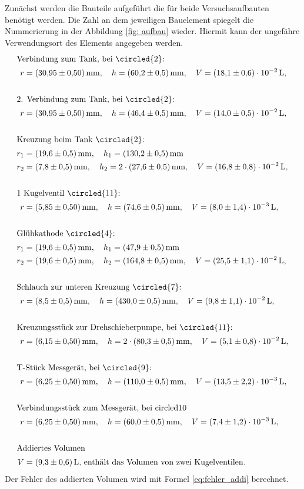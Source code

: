 Zunächst werden die Bauteile aufgeführt die für beide Versuchsaufbauten benötigt werden.
Die Zahl an dem jeweiligen Bauelement spiegelt die Nummerierung in der Abbildung \ref{fig: aufbau} wieder.
Hiermit kann der ungefähre Verwendungsort des Elements angegeben werden.
\begin{align*}
  \shortintertext{Verbindung zum Tank, bei \circled{2}:}
  r&=\SI{30.95\pm 0.5}{\milli\meter}, \quad h=\SI{60.2\pm0.5}{\milli\meter}, \quad V=\SI{ 18.1\pm0.6 e-2}{\litre},\\
  \\
  \shortintertext{2. Verbindung zum Tank, bei  \circled{2}:}
  r&=\SI{30.95\pm 0.5}{\milli\meter}, \quad h=\SI{46.4\pm0.5}{\milli\meter}, \quad V=\SI{ 14.0\pm0.5 e-2}{\litre},\\
  \\
  \shortintertext{Kreuzung beim Tank \circled{2}:}
  r_1&=\SI{19.6\pm 0.5}{\milli\meter}, \quad h_1=\SI{130.2\pm0.5}{\milli\meter}\\
  r_2&=\SI{7.8\pm 0.5}{\milli\meter}, \quad h_2=2\cdot  \SI{27.6\pm0.5}{\milli\meter}, \quad V=\SI{ 16.8\pm0.8 e-2}{\litre},\\
  \\
  \shortintertext{1 Kugelventil \circled{11}:}
  r&=\SI{5.85\pm 0.5}{\milli\meter}, \quad h=\SI{74.6\pm0.5}{\milli\meter}, \quad V=\SI{ 8.0\pm1.4 e-3}{\litre},\\
  \\
  \shortintertext{Glühkathode \circled{4}:}
  r_1&=\SI{19.6\pm 0.5}{\milli\meter}, \quad h_1=\SI{47.9\pm0.5}{\milli\meter}\\
  r_2&=\SI{19.6\pm 0.5}{\milli\meter}, \quad h_2=\SI{164.8\pm0.5}{\milli\meter}, \quad V=\SI{ 25.5\pm1.1 e-2}{\litre},\\
  \\
  \shortintertext{Schlauch zur unteren Kreuzung \circled{7}: }
  r&=\SI{8.5\pm 0.5}{\milli\meter}, \quad h=\SI{430\pm0.5}{\milli\meter}, \quad V=\SI{ 9.8\pm1.1 e-2}{\litre},\\
  \\
  \shortintertext{Kreuzungsstück zur Drehschieberpumpe, bei \circled{11}:}
  r&=\SI{6.15\pm 0.5}{\milli\meter}, \quad h=2\cdot\SI{80.3\pm0.5}{\milli\meter}, \quad V=\SI{ 5.1\pm0.8 e-2}{\litre},\\
  \\
  \shortintertext{T-Stück Messgerät, bei \circled{9}: }
  r&=\SI{6.25\pm 0.5}{\milli\meter}, \quad h=\SI{110\pm0.5}{\milli\meter}, \quad V=\SI{ 13.5\pm2.2 e-3}{\litre},\\
  \\
  \shortintertext{Verbindungsstück zum Messgerät, bei  circled{10}}
  r&=\SI{6.25\pm 0.5}{\milli\meter}, \quad h=\SI{60\pm0.5}{\milli\meter}, \quad V=\SI{ 7.4\pm1.2 e-3}{\litre},\\
  \\
  \shortintertext{Addiertes Volumen}
  V&=\SI{ 9.3\pm0.6}{\litre},\,  \text{enthält das Volumen von zwei Kugelventilen}.
\end{align*}
Der Fehler des addierten Volumen wird mit Formel \ref{eq:fehler_addi} berechnet.

